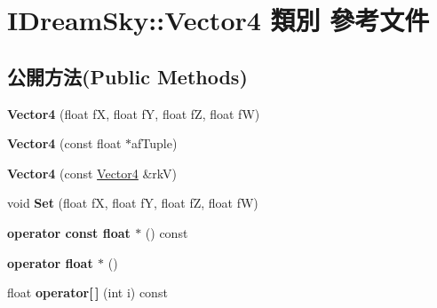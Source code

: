 \hypertarget{class_i_dream_sky_1_1_vector4}{}\section{I\+Dream\+Sky\+:\+:Vector4 類別 參考文件}
\label{class_i_dream_sky_1_1_vector4}
\subsection*{公開方法(Public Methods)}
\begin{DoxyCompactItemize}
\item 
{\bfseries Vector4} (float fX, float fY, float fZ, float fW)\hypertarget{class_i_dream_sky_1_1_vector4_a80c4c9ec4c3fbe1db960ab2d50ac7f38}{}\label{class_i_dream_sky_1_1_vector4_a80c4c9ec4c3fbe1db960ab2d50ac7f38}

\item 
{\bfseries Vector4} (const float $\ast$af\+Tuple)\hypertarget{class_i_dream_sky_1_1_vector4_ab7e1fac4ee588eec192771b0f4651606}{}\label{class_i_dream_sky_1_1_vector4_ab7e1fac4ee588eec192771b0f4651606}

\item 
{\bfseries Vector4} (const \hyperlink{class_i_dream_sky_1_1_vector4}{Vector4} \&rkV)\hypertarget{class_i_dream_sky_1_1_vector4_a6819e126b0298f567d57cb3d4dd82e07}{}\label{class_i_dream_sky_1_1_vector4_a6819e126b0298f567d57cb3d4dd82e07}

\item 
void {\bfseries Set} (float fX, float fY, float fZ, float fW)\hypertarget{class_i_dream_sky_1_1_vector4_a50d7a5d66d775516293159b0db19e439}{}\label{class_i_dream_sky_1_1_vector4_a50d7a5d66d775516293159b0db19e439}

\item 
{\bfseries operator const float $\ast$} () const \hypertarget{class_i_dream_sky_1_1_vector4_a56f9fd544fcc3b124a5edbb26305cad2}{}\label{class_i_dream_sky_1_1_vector4_a56f9fd544fcc3b124a5edbb26305cad2}

\item 
{\bfseries operator float $\ast$} ()\hypertarget{class_i_dream_sky_1_1_vector4_ae128a91dc05ac7e453fc98ae26ea918a}{}\label{class_i_dream_sky_1_1_vector4_ae128a91dc05ac7e453fc98ae26ea918a}

\item 
float {\bfseries operator\mbox{[}$\,$\mbox{]}} (int i) const \hypertarget{class_i_dream_sky_1_1_vector4_a00a383a75c067ab883e0a3a67c92ec11}{}\label{class_i_dream_sky_1_1_vector4_a00a383a75c067ab883e0a3a67c92ec11}


\end{DoxyCompactItemize}
